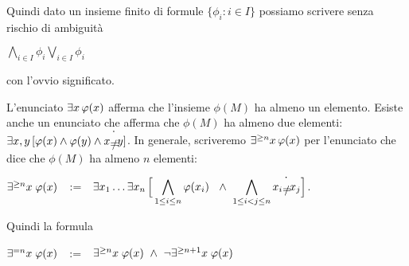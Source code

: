 Quindi dato un insieme finito di formule $\{\phi_i:i\in I\}$ possiamo scrivere senza rischio di ambiguit\`a

\hfil \emph{$\displaystyle\bigwedge_{i\in I}\phi_i$}\hfil \emph{$\displaystyle\bigvee_{i\in I}\phi_i$}

con l'ovvio significato. 

L'enunciato $\exists x\,\varphi(x)$ afferma che l'insieme $\phi(M)$ ha almeno un elemento. Esiste anche un enunciato che afferma che $\phi(M)$ ha almeno due elementi: $\E x,y\,[\phi(x)\wedge\phi(y)\wedge x\dot\neq y]$. In generale, scriveremo $\exists^{\ge n}x\,\varphi(x)$ per l'enunciato che dice che $\phi(M)$ ha almeno $n$ elementi:\smallskip

\hspace*{15ex}\emph{$\exists^{\ge n}x\;\varphi(x)$}\ \ :=\ \ $\displaystyle\E x_1\dots\E x_n\,\Big[\bigwedge_{1\le i\le n}\phi(x_i)\ \ \wedge\ \bigwedge_{1\le i<j\le n} x_i\dot\neq x_j\Big]$.

Quindi la formula\smallskip

\hspace*{15ex}\emph{$\exists^{=n}x\;\varphi(x)$}\ \ :=\ \ $\exists^{\ge n}x\;\varphi(x)\ \wedge\ \neg\exists^{\ge n+1}x\;\varphi(x)$
\smallskip

